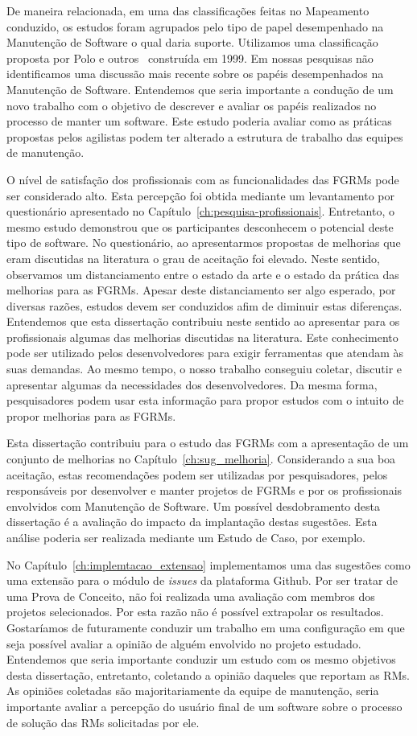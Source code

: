De maneira relacionada, em uma das classificações feitas no Mapeamento
conduzido, os estudos foram agrupados pelo tipo de papel desempenhado na
Manutenção de Software o qual daria suporte. Utilizamos uma classificação
proposta por Polo e outros~\cite{Polo1999} construída em 1999. Em nossas
pesquisas não identificamos uma discussão mais recente sobre os papéis
desempenhados na Manutenção de Software. Entendemos que seria importante a
condução de um novo trabalho com o objetivo de descrever e avaliar os papéis
realizados no processo de manter um software. Este estudo poderia avaliar como
as práticas propostas pelos agilistas podem ter alterado a estrutura de trabalho
das equipes de manutenção.

O nível de satisfação dos profissionais com as funcionalidades das FGRMs pode
ser considerado alto. Esta percepção foi obtida mediante um levantamento por
questionário apresentado no Capítulo~\ref{ch:pesquisa-profissionais}.
Entretanto, o mesmo estudo demonstrou que os participantes desconhecem o
potencial deste tipo de software. No questionário, ao apresentarmos propostas de
melhorias que eram discutidas na literatura o grau de aceitação foi elevado.
Neste sentido, observamos um distanciamento entre o estado da arte e o estado da
prática das melhorias para as FGRMs. Apesar deste distanciamento ser algo
esperado, por diversas razões, estudos devem ser conduzidos afim de diminuir
estas diferenças. Entendemos que esta dissertação contribuiu neste sentido ao
apresentar para os profissionais algumas das melhorias discutidas na literatura.
Este conhecimento pode ser utilizado pelos desenvolvedores para exigir
ferramentas que atendam às suas demandas. Ao mesmo tempo, o nosso trabalho
conseguiu coletar, discutir e apresentar algumas da necessidades dos
desenvolvedores. Da mesma forma, pesquisadores podem usar esta informação para
propor estudos com o intuito de propor melhorias para as FGRMs.

Esta dissertação contribuiu para o estudo das FGRMs com a apresentação de um
conjunto de melhorias no Capítulo~\ref{ch:sug_melhoria}. Considerando a sua boa
aceitação, estas recomendações podem ser utilizadas por pesquisadores, pelos
responsáveis por desenvolver e manter projetos de FGRMs e por os profissionais
envolvidos com Manutenção de Software. Um possível desdobramento desta
dissertação é a avaliação do impacto da implantação destas sugestões. Esta
análise poderia ser realizada mediante um Estudo de Caso, por exemplo.

No Capítulo~\ref{ch:implemtacao_extensao} implementamos uma das sugestões como
uma extensão para o módulo de \textit{issues} da plataforma Github. Por ser
tratar de uma Prova de Conceito, não foi realizada uma avaliação com membros dos
projetos selecionados. Por esta razão não é possível extrapolar os resultados.
Gostaríamos de futuramente conduzir um trabalho em uma configuração em que seja
possível avaliar a opinião de alguém envolvido no projeto estudado. Entendemos
que seria importante conduzir um estudo com os mesmo objetivos desta
dissertação, entretanto, coletando a opinião daqueles que reportam as RMs. As
opiniões coletadas são majoritariamente da equipe de manutenção, seria
importante avaliar a percepção do usuário final de um software sobre o processo
de solução das RMs solicitadas por ele.
